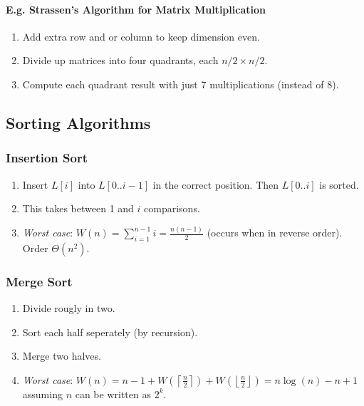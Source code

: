 \documentclass[twocolumn,english]{article}
\begin{document}
\paragraph{E.g. Strassen's Algorithm for Matrix Multiplication}
\begin{enumerate}
\item Add extra row and or column to keep dimension even.
\item Divide up matrices into four quadrants, each $n/2\times n/2$.
\item Compute each quadrant result with just 7 multiplications (instead
of 8).
\end{enumerate}

\subsection{Sorting Algorithms}


\subsubsection{Insertion Sort}
\begin{enumerate}
\item Insert $L\left[i\right]$ into $L\left[0..i-1\right]$ in the correct
position. Then $L\left[0..i\right]$ is sorted.
\item This takes between 1 and $i$ comparisons.
\item \emph{Worst case}: $W\left(n\right)=\sum_{i=1}^{n-1}i=\frac{n(n-1)}{2}$
(occurs when in reverse order). Order $\Theta\left(n^{2}\right)$.
\end{enumerate}

\subsubsection{Merge Sort}
\begin{enumerate}
\item Divide rougly in two.
\item Sort each half seperately (by recursion).
\item Merge two halves.
\item \emph{Worst case}: $W\left(n\right)=n-1+W\left(\left\lceil \frac{n}{2}\right\rceil \right)+W\left(\left\lfloor \frac{n}{2}\right\rfloor \right)=n\log\left(n\right)-n+1$
assuming $n$ can be written as $2^{k}$.
\end{enumerate}
\end{document}
